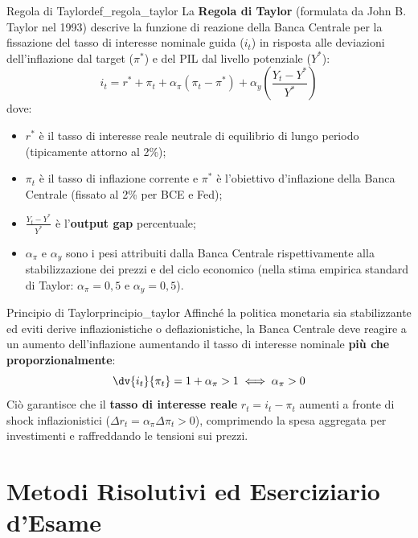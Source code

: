 \begin{definizione}{Regola di Taylor}{def_regola_taylor}
La \textbf{Regola di Taylor} (formulata da John B. Taylor nel 1993) descrive la funzione di reazione della Banca Centrale per la fissazione del tasso di interesse nominale guida ($i_t$) in risposta alle deviazioni dell'inflazione dal target ($\pi^*$) e del PIL dal livello potenziale ($Y^*$):
\begin{equation}
    i_t = r^* + \pi_t + \alpha_\pi (\pi_t - \pi^*) + \alpha_y \left( \frac{Y_t - Y^*}{Y^*} \right) \label{eq:regola_taylor}
\end{equation}
dove:
\begin{itemize}
    \item $r^*$ è il tasso di interesse reale neutrale di equilibrio di lungo periodo (tipicamente attorno al 2\%);
    \item $\pi_t$ è il tasso di inflazione corrente e $\pi^*$ è l'obiettivo d'inflazione della Banca Centrale (fissato al 2\% per BCE e Fed);
    \item $\frac{Y_t - Y^*}{Y^*}$ è l'\textbf{output gap} percentuale;
    \item $\alpha_\pi$ e $\alpha_y$ sono i pesi attribuiti dalla Banca Centrale rispettivamente alla stabilizzazione dei prezzi e del ciclo economico (nella stima empirica standard di Taylor: $\alpha_\pi = 0{,}5$ e $\alpha_y = 0{,}5$).
\end{itemize}
\end{definizione}

\begin{legge}{Principio di Taylor}{principio_taylor}
Affinché la politica monetaria sia stabilizzante ed eviti derive inflazionistiche o deflazionistiche, la Banca Centrale deve reagire a un aumento dell'inflazione aumentando il tasso di interesse nominale \textbf{più che proporzionalmente}:
\begin{equation}
    \dv{i_t}{\pi_t} = 1 + \alpha_\pi > 1 \iff \alpha_\pi > 0
\end{equation}
Ciò garantisce che il \textbf{tasso di interesse reale} $r_t = i_t - \pi_t$ aumenti a fronte di shock inflazionistici ($\Delta r_t = \alpha_\pi \Delta \pi_t > 0$), comprimendo la spesa aggregata per investimenti e raffreddando le tensioni sui prezzi.
\end{legge}

\section{Metodi Risolutivi ed Eserciziario d'Esame}

